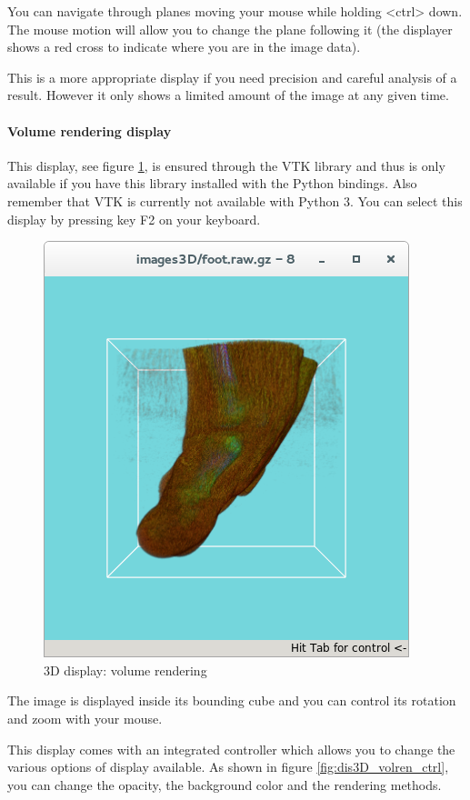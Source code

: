 \documentclass[a4paper,10pt,oneside]{article}
\begin{document}
You can navigate through planes moving your mouse while holding <ctrl> down.
The mouse motion will allow you to change the plane following it (the displayer
shows a red cross to indicate where you are in the image data).

This is a more appropriate display if you need precision and careful
analysis of a result. However it only shows a limited amount of the
image at any given time.

\paragraph{Volume rendering display}

This display, see figure \ref{fig:dis3D_volren}, is ensured through the VTK
library and thus is only available if you have this library installed with
the Python bindings. Also remember that VTK is currently not available with Python 3. 
You can select this display by pressing key F2 on your keyboard.

\begin{figure}
\centering
\includegraphics[scale=0.5]{images/dis3D_volren.png}
\caption{3D display: volume rendering}
\label{fig:dis3D_volren}
\end{figure}

The image is displayed inside its bounding cube and you can control its rotation
and zoom with your mouse.

This display comes with an integrated controller which allows you to change
the various options of display available. As shown in figure \ref{fig:dis3D_volren_ctrl},
you can change the opacity, the background color and the rendering methods.
\end{document}
